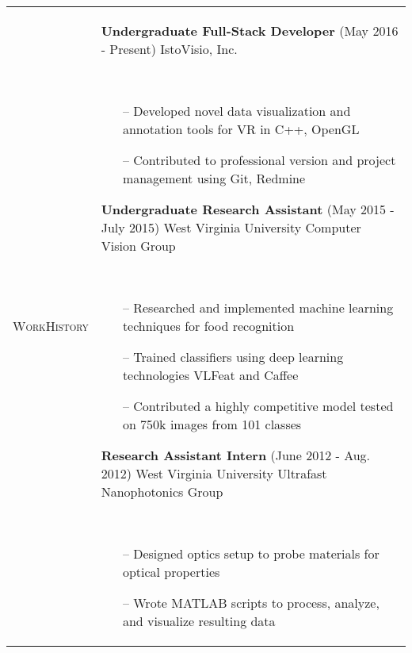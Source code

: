 \documentclass{article}
\begin{document}
\begin{tabular}{@{}p{2.5cm}@{\hspace{0.2cm}}p{13cm}@{}}
    \enspace\textsc{Work}\newline\textsc{History} &
    \enspace\textbf{Undergraduate Full-Stack Developer}
    \hfill\small(May 2016 - Present)\normalsize
    \newline IstoVisio, Inc.
    \par\,\small
        \begin{itemize}[leftmargin=*,nolistsep,noitemsep]
        \item[--]Developed novel data visualization and annotation tools for VR in C++, OpenGL
        \item[--]Contributed to professional version and project management using Git, Redmine
        \newline
        \end{itemize}
    \normalsize
    \textbf{Undergraduate Research Assistant}
    \hfill\small(May 2015 - July 2015)\normalsize
    \newline West Virginia University Computer Vision Group
    \par\,\small
        \begin{itemize}[leftmargin=*,nolistsep,noitemsep]
        \item[--]Researched and implemented machine learning techniques for food recognition
        \item[--]Trained classifiers using deep learning technologies VLFeat and Caffee
        \item[--]Contributed a highly competitive model tested on 750k images from 101 classes
        \newline
        \end{itemize}
    \normalsize
    \textbf{Research Assistant Intern}
    \hfill\small(June 2012 - Aug. 2012)\normalsize
    \newline West Virginia University Ultrafast Nanophotonics Group
    \par\,\small
      \begin{itemize}[leftmargin=*, nolistsep,noitemsep]
      \item[--]Designed optics setup to probe materials for optical properties
      \item[--]Wrote MATLAB scripts to process, analyze, and visualize resulting data
      \end{itemize}
    \normalsize \\


\end{tabular}
\end{document}
